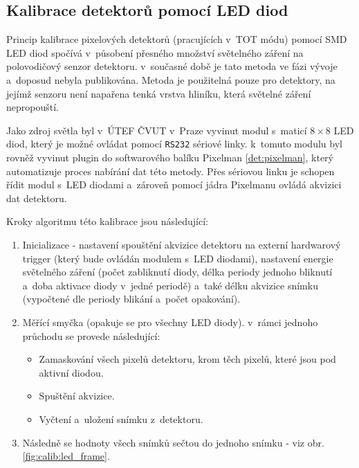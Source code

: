\subsection{Kalibrace detektorů pomocí LED diod}\label{calib:led}
Princip kalibrace pixelových detektorů (pracujících v~TOT módu) pomocí SMD LED diod spočívá v~působení přesného množství světelného záření na polovodičový senzor detektoru. v~současné době je tato metoda ve fázi vývoje a~doposud nebyla publikována. Metoda je použitelná pouze pro detektory, na jejímž senzoru není napařena tenká vrstva hliníku, která světelné záření nepropouští. 

Jako zdroj světla byl v~ÚTEF ČVUT v~Praze vyvinut modul s~maticí $8\times8$ LED diod, který je možné ovládat pomocí \texttt{RS232} sériové linky. k~tomuto modulu byl rovněž vyvinut plugin do softwarového balíku Pixelman \ref{det:pixelman}, který automatizuje proces nabírání dat této metody. Přes sériovou linku je schopen řídit modul s~LED diodami a~zároveň pomocí jádra Pixelmanu ovládá akvizici dat detektoru.

Kroky algoritmu této kalibrace jsou následující:
\begin{enumerate}
	\item Inicializace - nastavení spouštění akvizice detektoru na externí hardwarový trigger (který bude ovládán modulem s~LED diodami), nastavení energie světelného záření (počet zabliknutí diody, délka periody jednoho bliknutí a~doba aktivace diody v~jedné periodě) a~také délku akvizice snímku (vypočtené dle periody blikání a~počet opakování).
	\item Měřící smyčka (opakuje se pro všechny LED diody). v~rámci jednoho průchodu se provede následující:
		\begin{itemize}
			\item Zamaskování všech pixelů detektoru, krom těch pixelů, které jsou pod aktivní diodou.
			\item Spuštění akvizice.
			\item Vyčtení a~uložení snímku z~detektoru.
		\end{itemize}
	\item Následně se hodnoty všech snímků sečtou do jednoho snímku - viz obr. \ref{fig:calib:led_frame}.
\end{enumerate}

